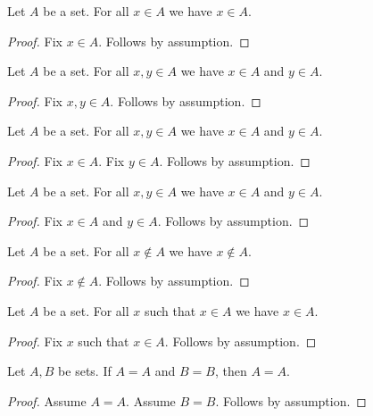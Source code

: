 \begin{proposition}\label{bounded_fix_single}
    Let $A$ be a set.
    For all $x\in A$ we have $x\in A$.
\end{proposition}
\begin{proof}
    Fix $x\in A$.
    Follows by assumption.
\end{proof}

\begin{proposition}\label{bounded_fix_multiple}
    Let $A$ be a set.
    For all $x,y\in A$ we have $x\in A$ and $y\in A$.
\end{proposition}
\begin{proof}
    Fix $x,y\in A$.
    Follows by assumption.
\end{proof}

\begin{proposition}\label{bounded_fix_repeated}
    Let $A$ be a set.
    For all $x,y\in A$ we have $x\in A$ and $y\in A$.
\end{proposition}
\begin{proof}
    Fix $x\in A$.
    Fix $y\in A$.
    Follows by assumption.
\end{proof}

\begin{proposition}\label{bounded_fix_and}
    Let $A$ be a set.
    For all $x,y\in A$ we have $x\in A$ and $y\in A$.
\end{proposition}
\begin{proof}
    Fix $x\in A$ and $y\in A$.
    Follows by assumption.
\end{proof}

\begin{proposition}\label{bounded_fix_negative}
    Let $A$ be a set.
    For all $x\notin A$ we have $x\notin A$.
\end{proposition}
\begin{proof}
    Fix $x\notin A$.
    Follows by assumption.
\end{proof}

\begin{proposition}\label{fix_such_that}
    Let $A$ be a set.
    For all $x$ such that $x\in A$ we have $x\in A$.
\end{proposition}
\begin{proof}
    Fix $x$ such that $x\in A$.
    Follows by assumption.
\end{proof}

\begin{proposition}\label{assume_left_conjunct}
    Let $A,B$ be sets.
    If $A=A$ and $B=B$, then $A=A$.
\end{proposition}
\begin{proof}
    Assume $A=A$.
    Assume $B=B$.
    Follows by assumption.
\end{proof}

